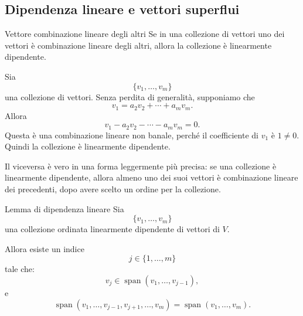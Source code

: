 \documentclass[a4paper]{article}
\begin{document}
\subsection{Dipendenza lineare e vettori superflui}

\begin{snippetproposition}{Vettore combinazione lineare degli altri}
    Se in una collezione di vettori uno dei vettori è combinazione lineare degli altri, allora la collezione è linearmente dipendente.
\end{snippetproposition}

\begin{snippetproof}{}
    Sia
    \[
        \{v_1,\ldots,v_m\}
    \]
    una collezione di vettori. Senza perdita di generalità, supponiamo che
    \[
        v_1=a_2v_2+\cdots+a_mv_m.
    \]
    Allora
    \[
        v_1-a_2v_2-\cdots-a_mv_m=0.
    \]
    Questa è una combinazione lineare non banale, perché il coefficiente di \(v_1\) è \(1\neq 0\). Quindi la collezione è linearmente dipendente.
\end{snippetproof}

Il viceversa è vero in una forma leggermente più precisa: se una collezione è linearmente dipendente, allora almeno uno dei suoi vettori è combinazione lineare dei precedenti, dopo avere scelto un ordine per la collezione.

\begin{snippettheorem}{Lemma di dipendenza lineare}
    Sia
    \[
        \{v_1,\ldots,v_m\}
    \]
    una collezione ordinata linearmente dipendente di vettori di \(V\).

    Allora esiste un indice
    \[
        j\in\{1,\ldots,m\}
    \]
    tale che:
    \[
        v_j\in\operatorname{span}(v_1,\ldots,v_{j-1}),
    \]
    e
    \[
        \operatorname{span}(v_1,\ldots,v_{j-1},v_{j+1},\ldots,v_m)
        =
        \operatorname{span}(v_1,\ldots,v_m).
    \]
\end{snippettheorem}
\end{document}
